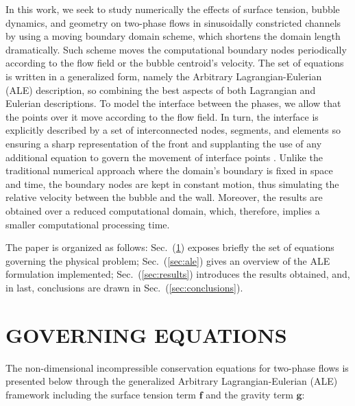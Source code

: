 \documentclass{wccm2014}
\begin{document}
In this work, we seek to study numerically the effects of surface
tension, bubble dynamics, and geometry on two-phase flows in
sinusoidally constricted channels by using a moving boundary domain
scheme, which shortens the domain length dramatically. Such scheme moves
the computational boundary nodes periodically according to the flow
field or the bubble centroid's velocity. The set of equations is written
in a generalized form, namely the Arbitrary Lagrangian-Eulerian (ALE)
description, so combining the best aspects of both Lagrangian and
Eulerian descriptions. To model the interface between the phases, we
allow that the points over it move according to the flow field. In turn,
the interface is explicitly described by a set of interconnected nodes,
segments, and elements so ensuring a sharp representation of the front
and supplanting the use of any additional equation to govern the movement
of interface points \cite{anjos2012,anjos2014}. Unlike the
traditional numerical approach where the domain's boundary is fixed in
space and time, the boundary nodes are kept in constant motion, thus
simulating the relative velocity between the bubble and the wall.
Moreover, the results are obtained over a reduced computational domain,
which, therefore, implies a smaller computational processing time.

The paper is organized as follows: Sec.~(\ref{sec:governing}) exposes
briefly the set of equations governing the physical problem;
Sec.~(\ref{sec:ale}) gives an overview of the ALE formulation
implemented; Sec.~(\ref{sec:results}) introduces the results obtained,
and, in last, conclusions are drawn in Sec.~(\ref{sec:conclusions}). 

\section{GOVERNING EQUATIONS}
\label{sec:governing}
The non-dimensional incompressible conservation equations for two-phase
flows is presented below through the generalized Arbitrary
Lagrangian-Eulerian (ALE) framework including the surface tension term
$\mathbf{f}$ and the gravity term $\mathbf{g}$: 
\end{document}
